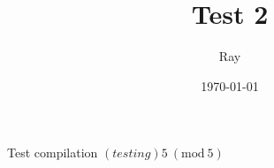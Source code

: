 \documentclass[12pt]{article}
\title{Test 2}
\author{Ray}
\date{\today}
\newcommand{\tmod}[1]{~(\text{mod}~#1)}
\theoremstyle{definition}
\begin{document}
\maketitle
\doublespacing

Test compilation
\( (testing) 5 \tmod{5}\)
\end{document}
